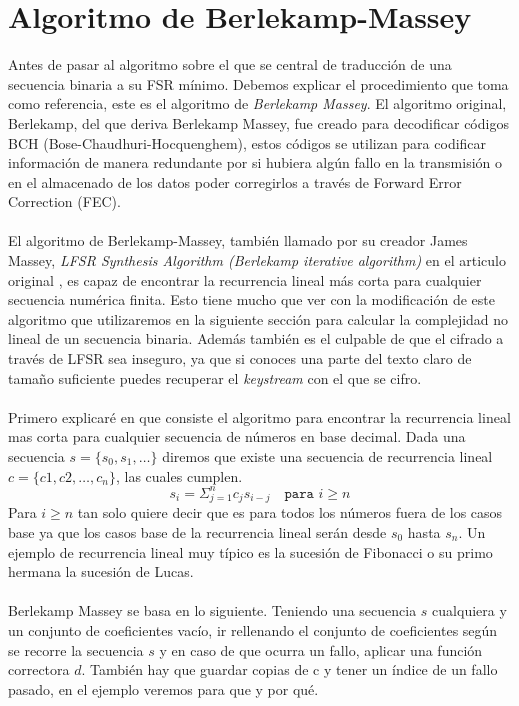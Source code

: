 \section{Algoritmo de Berlekamp-Massey}
Antes de pasar al algoritmo sobre el que se central de traducción de una secuencia binaria a su FSR mínimo. Debemos explicar el procedimiento que toma como referencia, este es el algoritmo de \textit{Berlekamp Massey}. El algoritmo original, Berlekamp, del que deriva Berlekamp Massey, fue creado para decodificar códigos BCH (Bose-Chaudhuri-Hocquenghem), estos códigos se utilizan para codificar información de manera redundante por si hubiera algún fallo en la transmisión o en el almacenado de los datos poder corregirlos a través de Forward Error Correction (FEC). \\\\
El algoritmo de Berlekamp-Massey, también llamado por su creador James Massey, \textit{LFSR Synthesis Algorithm (Berlekamp iterative algorithm)} en el articulo original \cite{massey1969shift}, es capaz de encontrar la recurrencia lineal más corta para cualquier secuencia numérica finita. Esto tiene mucho que ver con la modificación de este algoritmo que utilizaremos en la siguiente sección para calcular la complejidad no lineal de un secuencia binaria. Además también es el culpable de que el cifrado a través de LFSR sea inseguro, ya que si conoces una parte del texto claro de tamaño suficiente puedes recuperar el \textit{keystream} con el que se cifro.\\\\
Primero explicaré en que consiste el algoritmo para encontrar la recurrencia lineal mas corta para cualquier secuencia de números en base decimal. Dada una secuencia $s = \{s_0, s_1, \dots\}$ diremos que existe una secuencia de recurrencia lineal $c = \{c1, c2, \dots, c_n\}$, las cuales cumplen.
\[s_i = \Sigma_{j=1}^n c_js_{i-j} \quad \texttt{para $i \geq n$}\]
Para $i \geq n$ tan solo quiere decir que es para todos los números fuera de los casos base ya que los casos base de la recurrencia lineal serán desde $s_0$ hasta $s_n$. Un ejemplo de recurrencia lineal muy típico es la sucesión de Fibonacci o su primo hermana la sucesión de Lucas. \\\\
Berlekamp Massey se basa en lo siguiente. Teniendo una secuencia $s$ cualquiera y un conjunto de coeficientes vacío, ir rellenando el conjunto de coeficientes según se recorre la secuencia $s$ y en caso de que ocurra un fallo, aplicar una función correctora $d$. También hay que guardar copias de c y tener un índice de un fallo pasado, en el ejemplo veremos para que y por qué.\\\\ 
